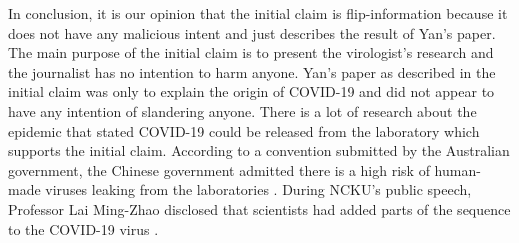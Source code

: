 \documentclass[a4paper, 12pt]{article}
\begin{document}
\begin{CJK*}{UTF8}{bsmi}
    In conclusion, it is our opinion that the initial claim is flip-information because 
    it does not have any malicious intent and just describes the result of Yan's paper.
    The main purpose of the initial claim is to present the virologist's research and 
    the journalist has no intention to harm anyone. Yan's paper as described in 
    the initial claim was only to explain the origin of COVID-19 and did not appear to 
    have any intention of slandering anyone. There is a lot of research about the epidemic 
    that stated COVID-19 could be released from the laboratory which supports the initial
    claim. According to a convention submitted by the Australian government, the Chinese
    government admitted there is a high risk of human-made viruses leaking from the 
    laboratories \parencite{202106280087}. During NCKU's public speech, Professor Lai
    Ming-Zhao disclosed that scientists had added parts of the sequence to the COVID-19
    virus \parencite{5829288}.

    \printbibliography[title=REFERENCES]

\end{CJK*}
\end{document}

